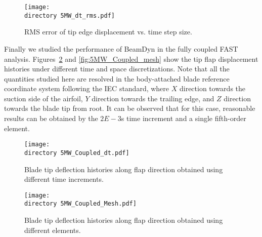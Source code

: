 \documentclass{aiaa-tc}
\def\directory{EPSF/}
\begin{document}
\begin{figure}
    \centering
\texttt{[image: \\directory  5MW\_dt\_rms.pdf]}
\caption{RMS error of tip edge displacement vs. time step size.}
\label{fig:5MWdt_rms}
\end{figure} 

Finally we studied the performance of BeamDyn in the fully coupled FAST analysis. Figures~\ref{fig:5MW_Coupled_dt} and \ref{fig:5MW_Coupled_mesh} show the tip flap displacement histories under different time and space discretizations. Note that all the quantities studied here are resolved in the body-attached blade reference coordinate system following the IEC standard, where $X$ direction towards the suction side of the airfoil, $Y$ direction towards the trailing edge, and $Z$ direction towards the blade tip from root. It can be observed that for this case, reasonable results can be obtained by the $2E-3$s time increment and a single fifth-order element.  

\begin{figure}
    \centering
\texttt{[image: \\directory  5MW\_Coupled\_dt.pdf]}
\caption{Blade tip deflection histories along flap direction obtained using different time increments.}
\label{fig:5MW_Coupled_dt}
\end{figure} 

\begin{figure}
    \centering
\texttt{[image: \\directory  5MW\_Coupled\_Mesh.pdf]}
\caption{Blade tip deflection histories along flap direction obtained using different elements.}
\label{fig:5MW_Coupled_Mesh}
\end{figure} 
\end{document}
